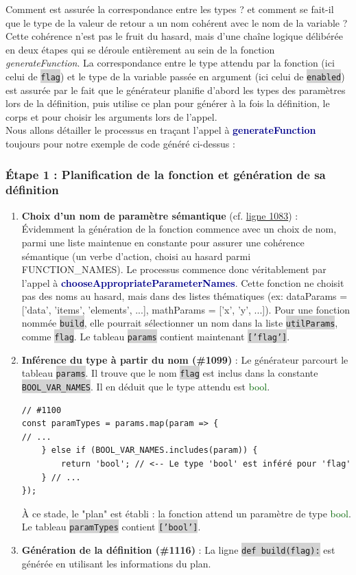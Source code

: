 \documentclass[11pt,a4paper]{article}
\newcommand{\code}[1]{\colorbox{lightgray}{\texttt{\small #1}}}
\newcommand{\vartype}[1]{\textcolor{darkgreen}{#1}}
\newcommand{\methodname}[1]{\textbf{\textcolor{darkblue}{#1}}}
\begin{document}
Comment est assurée la correspondance entre les types ? et comment se fait-il que le type de la valeur de retour a un nom cohérent avec le nom de la variable ? Cette cohérence n'est pas le fruit du hasard, mais d'une chaîne logique délibérée en deux étapes qui se déroule entièrement au sein de la fonction \textit{generateFunction}. La correspondance entre le type attendu par la fonction (ici celui de \code{flag}) et le type de la variable passée en argument (ici celui de \code{enabled}) est assurée par le fait que le générateur planifie d'abord les types des paramètres lors de la définition, puis utilise ce plan pour générer à la fois la définition, le corps et pour choisir les arguments lors de l'appel. \\ Nous allons détailler le processus en traçant l'appel à \methodname{generateFunction} toujours pour notre exemple de code généré ci-dessus :
\subsubsection*{Étape 1 : Planification de la fonction et génération de sa définition}
\begin{enumerate}
\item \textbf{Choix d'un nom de paramètre sémantique} (cf. \href{https://github.com/edu-mateescoj/gyminf/blob/main/static/js/code-generator.js#L1083}{ligne 1083}) : Évidemment la génération de la fonction commence avec un choix de nom, parmi une liste maintenue en constante pour assurer une cohérence sémantique (un verbe d'action, choisi au hasard parmi FUNCTION\_NAMES). Le processus commence donc véritablement par l'appel à \methodname{chooseAppropriateParameterNames}. Cette fonction ne choisit pas des noms au hasard, mais dans des listes thématiques (ex: dataParams = ['data', 'items', 'elements', ...], mathParams = ['x', 'y', ...]).  Pour une fonction nommée \code{build}, elle pourrait sélectionner un nom dans la liste \code{utilParams}, comme \code{flag}. Le tableau \code{params} contient maintenant \code{['flag']}.

\item \textbf{Inférence du type à partir du nom (\#1099)} : Le générateur parcourt le tableau \code{params}. Il trouve que le nom \code{flag} est inclus dans la constante \code{BOOL\_VAR\_NAMES}. Il en déduit que le type attendu est \vartype{bool}.
\begin{verbatim}
// #1100
const paramTypes = params.map(param => {
// ...
    } else if (BOOL_VAR_NAMES.includes(param)) {
        return 'bool'; // <-- Le type 'bool' est inféré pour 'flag'
    } // ...
});
\end{verbatim}
À ce stade, le "plan" est établi : la fonction attend un paramètre de type \vartype{bool}. Le tableau \code{paramTypes} contient \code{['bool']}.

\item \textbf{Génération de la définition (\#1116)} : La ligne \code{def build(flag):} est générée en utilisant les informations du plan.

\end{enumerate}
\end{document}
